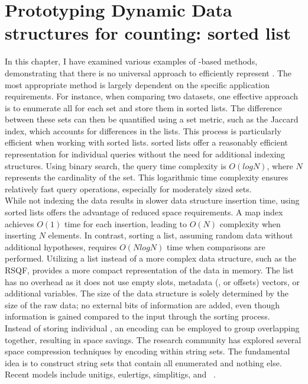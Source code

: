 \section{Prototyping Dynamic Data structures for \kmer counting: \skmer sorted list}
\label{sec:skmers}
In this chapter, I have examined various examples of \kmer-based methods, demonstrating that there is no universal approach to efficiently represent \kmers. The most appropriate method is largely dependent on the specific application requirements. For instance, when comparing two datasets, one effective approach is to enumerate all \kmers for each set and store them in sorted lists. The difference between these sets can then be quantified using a set metric, such as the Jaccard index, which accounts for \kmer differences in the lists. This process is particularly efficient when working with sorted lists. sorted \kmer lists offer a reasonably efficient representation for individual \kmer queries without the need for additional indexing structures. Using binary search, the query time complexity is $O(log{N})$, where $N$ represents the cardinality of the set. This logarithmic time complexity ensures relatively fast query operations, especially for moderately sized sets.\\
While not indexing the data results in slower data structure insertion time, using sorted lists offers the advantage of reduced space requirements. A map index achieves $O(1)$ time for each insertion, leading to $O(N)$ complexity when inserting $N$ elements. In contrast, sorting a list, assuming random data without additional hypotheses, requires $O(Nlog{N})$ time when comparisons are performed. Utilizing a list instead of a more complex data structure, such as the RSQF, provides a more compact representation of the data in memory. The list has no overhead as it does not use empty slots, metadata (\occs, \rends or offsets) vectors, or additional variables. The size of the data structure is solely determined by the size of the raw data; no external bits of information are added, even though information is gained compared to the input through the sorting process.\\
Instead of storing individual \kmers, an encoding can be employed to group overlapping \kmer together, resulting in space savings. The \kmer research community has explored several space compression techniques by encoding \kmers within string sets. The fundamental idea is to construct string sets that contain all enumerated \kmers and nothing else. Recent models include unitigs, eulertigs, simplitigs, and \skmers ~\cite{marchet2024kmersets}.\\
